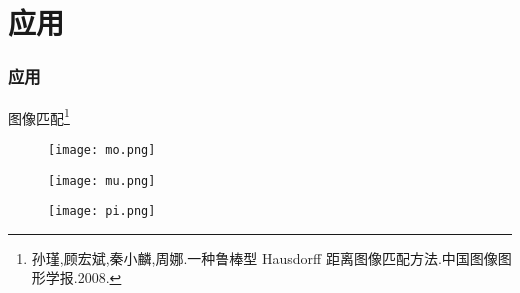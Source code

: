 \documentclass[notheorems,mathserif,table,compress]{beamer}  %
\begin{document}
\section{应用} 
\begin{frame}
\frametitle{应用}
 图像匹配\footnote{孙瑾,顾宏斌,秦小麟,周娜.一种鲁棒型 Hausdorff 距离图像匹配方法.中国图像图形学报.2008.}

   \begin{figure}[!ht]
    \begin{minipage}{0.2\textwidth}
    \centering
    \texttt{[image: mo.png]}
    \end{minipage}
    \begin{minipage}{0.2\textwidth}
    \centering
    \texttt{[image: mu.png]}
    \end{minipage}
   \end{figure}
   \begin{figure}[!ht]
    \centering
    \texttt{[image: pi.png]}
   \end{figure}
\end{frame}
\end{document}

